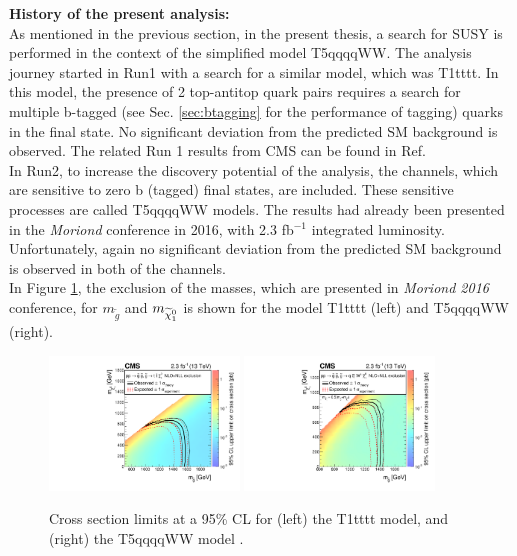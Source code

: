 \textbf{History of the present analysis:}
\\
As mentioned in the previous section, in the present thesis, a search for SUSY is performed in the context of the simplified model T5qqqqWW. The analysis journey started in Run1 with a search for a similar model, which was T1tttt. In this model, the presence of 2 top-antitop quark pairs requires a search for multiple b-tagged (see Sec. \ref{sec:btagging} for the performance of tagging) quarks in the final state. No significant deviation from the predicted SM background is observed. The related Run 1 results from CMS can be found in Ref. \cite{SUSRun1}  \\
In Run2, to increase the discovery potential of the analysis, the channels, which are sensitive to zero b (tagged) final states, are included. These sensitive processes are called T5qqqqWW models. The results had already been presented in the \textit{Moriond} conference in 2016, with 2.3 fb$^{-1}$ integrated luminosity. Unfortunately, again no significant deviation from the predicted SM background is observed in both of the channels.  \\
In Figure \ref{fig:Moriond}, the exclusion of the masses, which are presented in \textit{Moriond 2016} conference, for $m_{\tilde{g}}$ and $m_{\widetilde{\chi}^0_1}$ is shown for the model T1tttt (left) and T5qqqqWW (right).
\begin{figure}[!hb]
  \includegraphics[width=0.45\textwidth]{Plots/analysis/results/CMS-SUS-15-006_Figure_007-a}
  \hfil
  \includegraphics[width=0.45\textwidth]{Plots/analysis/results/CMS-SUS-15-006_Figure_007-b}
\centering
  \caption{\label{fig:Moriond} Cross section limits at a 95\% CL for (left) the T1tttt model, and (right) the T5qqqqWW model \cite{SUS_16_005}.
  }
\end{figure}
